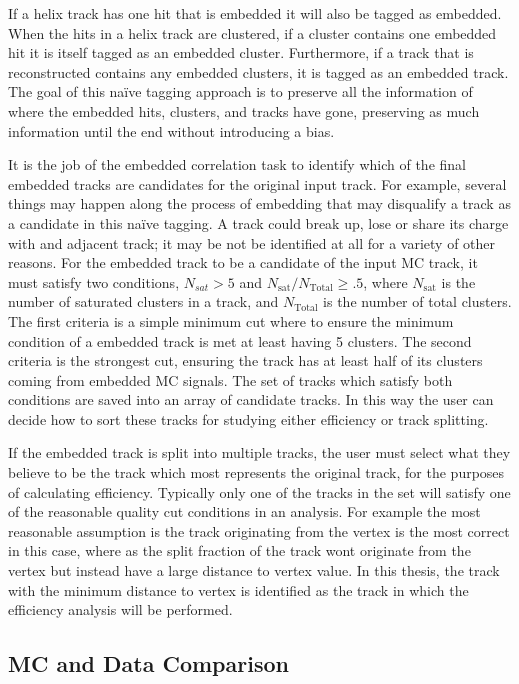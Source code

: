  If a helix track has one hit that is embedded it will also be tagged as embedded. When the hits in a helix track are clustered, if a cluster contains one embedded hit it is itself tagged as an embedded cluster. Furthermore, if a track that is reconstructed contains any embedded clusters, it is tagged as an embedded track. The goal of this na\"ive tagging approach is to preserve all the information of where the embedded hits, clusters, and tracks have gone, preserving as much information until the end without introducing a bias.
 
  It is the job of the embedded correlation task to identify which of the final embedded tracks are candidates for the original input track. For example, several things may happen along the process of embedding that may disqualify a track as a candidate in this na\"ive tagging. A track could break up, lose or share its charge with and adjacent track; it may be not be identified at all for a variety of other reasons. For the embedded track to be a candidate of the input MC track, it must satisfy two conditions, $N_{sat} > 5$ and $N_{\mathrm{sat}}/N_{\mathrm{Total}} \geq .5$, where $N_{\mathrm{sat}}$ is the number of saturated clusters in a track, and $N_{\mathrm{Total}}$ is the number of total clusters. The first criteria is a simple minimum cut where to ensure the minimum condition of a embedded track is met at least having 5 clusters. The second criteria is the strongest cut, ensuring the track has at least half of its clusters coming from embedded MC signals. The set of tracks which satisfy both conditions are saved into an array of candidate tracks. In this way the user can decide how to sort these tracks for studying either efficiency or track splitting. 

If the embedded track is split into multiple tracks, the user must select what they believe to be the track which most represents the original track, for the purposes of calculating efficiency. Typically only one of the tracks in the set will satisfy one of the reasonable quality cut conditions in an analysis. For example the most reasonable assumption is the track originating from the vertex is the most correct in this case, where as the split fraction of the track wont originate from the vertex but instead have a large distance to vertex value. In this thesis, the track with the minimum distance to vertex is identified as the track in which the efficiency analysis will be performed.


\subsection{MC and Data Comparison}

